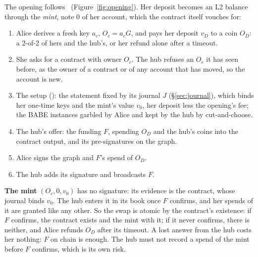 \documentclass[11pt]{article}
\theoremstyle{plain}
\theoremstyle{definition}
\newcommand{\Oc}{O_c}
\begin{document}
The opening follows~\cite{lichen} (Figure~\ref{fig:opening}). Her
deposit becomes an L2 balance through the \emph{mint}, note 0 of her
account, which the contract itself vouches for:
\begin{enumerate}[nosep]
\item Alice derives a fresh key $a_c$, $\Oc = a_cG$, and pays her
  deposit $v_D$ to a coin $O_D$: a 2-of-2 of hers and the hub's, or her
  refund alone after a timeout.
\item She asks for a contract with owner $\Oc$. The hub refuses an $\Oc$
  it has seen before, as the owner of a contract or of any account that
  has moved, so the account is new.
\item The setup (\cite{lichen}): the statement fixed by its journal $J$
  (\S\ref{sec:journal}), which binds her one-time keys and the mint's
  value $v_0$, her deposit less the opening's fee; the BABE instances
  garbled by Alice and kept by the hub by cut-and-choose.
\item The hub's offer: the funding $F$, spending $O_D$ and the hub's
  coins into the contract output, and its pre-signatures on the graph.
\item Alice signs the graph and $F$'s spend of $O_D$.
\item The hub adds its signature and broadcasts $F$.
\end{enumerate}
\textbf{The mint} $(\Oc, 0, v_0)$ has no signature: its evidence is the
contract, whose journal binds $v_0$. The hub enters it in its book once
$F$ confirms, and her spends of it are granted like any other. So the
swap is atomic by the contract's existence: if $F$ confirms, the
contract exists and the mint with it; if it never confirms, there is
neither, and Alice refunds $O_D$ after its timeout. A lost answer from
the hub costs her nothing: $F$ on chain is enough. The hub must not
record a spend of the mint before $F$ confirms, which is its own risk.
\end{document}
